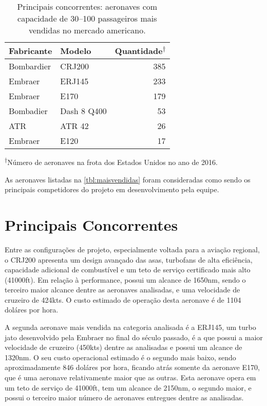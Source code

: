 \begin{table}[bt]
\centering
\begin{tabular}{llr}
\toprule
Fabricante & Modelo & Quantidade\textsuperscript{$\dagger$} \\ \midrule
Bombardier & CRJ200 & 385 \\
Embraer    & ERJ145	& 233 \\
Embraer    & E170	& 179 \\
Bombadier  & Dash 8 Q400 & 53 \\
ATR		   & ATR 42 & 26 \\
Embraer    & E120   & 17 \\
\bottomrule
\end{tabular}

{\footnotesize\textsuperscript{$\dagger$}Número de aeronaves na frota dos Estados Unidos no ano de 2016.}
\caption[Principais concorrentes]{Principais concorrentes: aeronaves com capacidade de 30--100 passageiros mais vendidas no mercado americano.\cite{fiaeroweb}}
\label{tbl:maisvendidas}
\end{table}

As aeronaves listadas na 
 \autoref{tbl:maisvendidas} foram consideradas como sendo os principais competidores do projeto em desenvolvimento pela equipe.


\section{Principais Concorrentes}
    Entre as configurações de projeto, especialmente voltada para a aviação regional, o CRJ200 apresenta um design avançado das asas, turbofans de alta eficiência, capacidade adicional de combustível e um teto de serviço certificado mais alto (41000ft). Em relação à performance, possui um alcance de 1650nm, sendo o terceiro maior alcance dentre as aeronaves analisadas, e uma velocidade de cruzeiro de 424kts. O custo estimado de operação desta aeronave é de 1104 doláres por hora. 
	
    A segunda aeronave mais vendida na categoria analisada é a ERJ145, um turbo jato desenvolvido pela Embraer no final do século passado, é a que possui a maior velocidade de cruzeiro (450kts) dentre as analisadas e possui um alcance de 1320nm. O seu custo operacional estimado é o segundo mais baixo, sendo aproximadamente 846 doláres por hora, ficando atrás somente da aeronave E170, que é uma aeronave relativamente maior que as outras. Esta aeronave opera em um teto de serviço de 41000ft, tem um alcance de 2150nm, o segundo maior, e possui o terceiro maior número de aeronaves entregues dentre as analisadas. 
	
